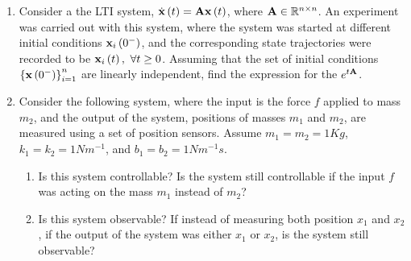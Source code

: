\documentclass[9pt]{article}
\def\mf{\ensuremath\mathbf}
\def\mb{\ensuremath\mathbb}
\def\lp{\ensuremath\left(}
\def\rp{\ensuremath\right)}
\def\lc{\ensuremath\left\{}
\def\rc{\ensuremath\right\}}
\newcommand{\ct}[1]{\lp #1\rp}
\begin{document}
\begin{multicols}{2}
\begin{enumerate}[resume]
    \item Consider a the LTI system, $\dot{\mf{x}}\ct{t} = \mf{A}\mf{x}\ct{t}$, where $\mf{A} \in \mb{R}^{n \times n}$. An experiment was carried out with this system, where the system was started at different initial conditions $\mf{x}_i\ct{0^-}$, and the corresponding state trajectories were recorded to be $\mf{x}_i\ct{t}, \,\, \forall t \geq 0$. Assuming that the set of initial conditions$\lc \mf{x}\ct{0^-} \rc_{i=1}^n$ are linearly independent, find the expression for the $e^{t\mf{A}}$.

    \item Consider the following system, where the input is the force $f$ applied to mass $m_2$, and the output of the system, positions of masses $m_1$ and $m_2$, are measured using a set of position sensors. Assume $m_1 = m_2 = 1Kg$, $k_1 = k_2 = 1 Nm^{-1}$, and $b_1 = b_2 = 1 Nm^{-1}s$.
    \begin{enumerate}
        \item Is this system controllable? Is the system still controllable if the input $f$ was acting on the mass $m_1$ instead of $m_2$?
        \item Is this system observable? If instead of measuring both position $x_1$ and $x_2$, if the output of the system was either $x_1$ or $x_2$, is the system still observable?
    \end{enumerate}
    \begin{center}
\end{center}
\end{enumerate}
\end{multicols}
\end{document}
